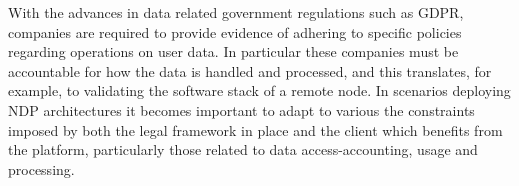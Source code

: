 With the advances in data related government regulations such as GDPR, companies are required to provide evidence of adhering to specific policies regarding operations on user data. In particular these companies must be accountable for how the data is handled and processed, and this translates, for example, to validating the software stack of a remote node. In scenarios deploying NDP architectures it becomes important to adapt to various the constraints imposed by both the legal framework in place and the client which benefits from the platform, particularly those related to data access-accounting, usage and processing.

\fi